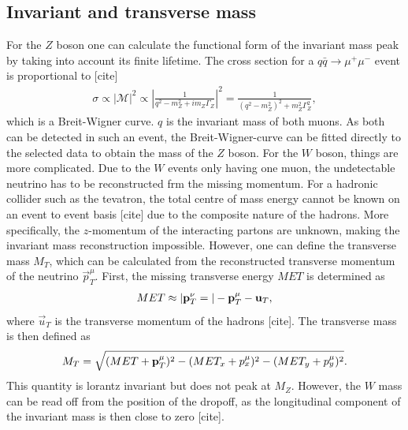 \documentclass[twoside,        %
               BCOR12mm,       %
               ngerman,english, %
               fleqn,headsepline=false,footsepline=false
              ]{Vorlage/MFPREPORT}
\begin{document}
\subsection{Invariant and transverse mass}
For the $Z$ boson one can calculate the functional form of the invariant mass
peak by taking into account its finite lifetime.
The cross section for a $q\bar q\rightarrow \mu^+\mu^-$ event is proportional
to [cite]
\begin{align}
    \sigma\propto|\mathcal{M}|^2\propto\left|\frac{1}{q^2-m_Z^2+im_Z\Gamma_Z}\right|^2=\frac{1}{(q^2-m_Z^2)^2+m_Z^2\Gamma_Z^2},
    \label{eq:breit}
\end{align}which is a Breit-Wigner curve.
$q$ is the invariant mass of both muons. As both can be detected in such an
event, the Breit-Wigner-curve can be fitted directly to the selected data to
obtain the mass of the $Z$ boson.
For the $W$ boson, things are more complicated. Due to the $W$ events only
having one muon, the undetectable neutrino has to be reconstructed frm the
missing momentum. For a hadronic collider such as the tevatron, the total
centre of mass energy cannot be known on an event to event basis [cite] due to
the composite nature of the hadrons. More specifically, the $z$-momentum of the
interacting partons are unknown, making the invariant mass reconstruction
impossible. However, one can define the transverse mass $M_T$, which can be
calculated from the reconstructed transverse momentum of the neutrino
$\vec{p}_T^\mu$. First, the missing transverse energy $MET$ is determined as
\begin{align}
    MET\approx|\bold{p}_T^\nu=|-\bold{p}_T^\mu-\bold{u}_T,
    \label{eq:met}
\end{align}where $\vec{u}_T$ is the transverse momentum of the hadrons [cite].
The transverse mass is then defined as
\begin{align}
    M_T=\sqrt{(MET+\bold{p}_T^\mu)^2-(MET_x+p_x^\mu)^2-(MET_y+p_y^\mu)^2}.
    \label{eq:mt}
\end{align}
This quantity is lorantz invariant but does not peak at $M_Z$. However, the $W$
mass can be read off from the position of the dropoff, as the longitudinal
component of the invariant mass is then close to zero [cite].
\end{document}
